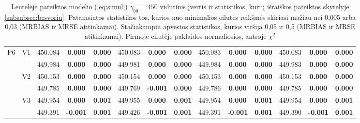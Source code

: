 \documentclass[11pt,a4paper]{article}
\begin{document}
{\begin{sidewaystable}[H]
{{\begin{tabular}{cc|ccc|ccc|ccc|ccc|}
   \hline \hline\multirow{6}{*}{P6} & \multirow{2}{*}{V1} & 450.084 & \textbf{0.000} & \textbf{0.000} & 450.083 & \textbf{0.000} & \textbf{0.000} & 450.083 & \textbf{0.000} & \textbf{0.000} & 450.083 & \textbf{0.000} & \textbf{0.000} \\ 
   &  & 449.984 & \textbf{0.000} & \textbf{0.000} & 449.981 & \textbf{0.000} & \textbf{0.000} & 449.984 & \textbf{0.000} & \textbf{0.000} & 449.983 & \textbf{0.000} & \textbf{0.000} \\ 
   & \multirow{2}{*}{V2} & 450.153 & \textbf{0.000} & \textbf{0.000} & 450.154 & \textbf{0.000} & \textbf{0.000} & 450.153 & \textbf{0.000} & \textbf{0.000} & 450.153 & \textbf{0.000} & \textbf{0.000} \\ 
   &  & 449.785 & \textbf{0.000} & \textbf{0.000} & 449.769 & \textbf{-0.001} & \textbf{0.000} & 449.786 & \textbf{0.000} & \textbf{0.000} & 449.785 & \textbf{0.000} & \textbf{0.000} \\ 
   & \multirow{2}{*}{V3} & 449.954 & \textbf{0.000} & \textbf{0.001} & 449.955 & \textbf{0.000} & \textbf{0.001} & 449.954 & \textbf{0.000} & \textbf{0.001} & 449.954 & \textbf{0.000} & \textbf{0.001} \\ 
   &  & 449.391 & \textbf{-0.001} & \textbf{0.001} & 449.426 & \textbf{-0.001} & \textbf{0.001} & 449.391 & \textbf{-0.001} & \textbf{0.001} & 449.390 & \textbf{-0.001} & \textbf{0.001} \\ 
   \hline
\end{tabular}}
}
\caption{Lentelėje pateiktos modelio (\ref{eq:simul}) $\gamma_{00}=450$ vidutinis įvertis ir statistikos, kurių išraiškos pateiktos skyrelyje \ref{subsubsec:besvoriu}. Patamsintos statistikos tos, kurios nuo minimalios eilutės reikšmės skiriasi mažiau nei 0,005 arba 0,03 (MRBIAS ir MRSE atitinkamai). Stačiakampiu apvestos statistikos, kurios viršija 0,05 ir 0,5 (MRBIAS ir MRSE atitinkamai). Pirmoje eilutėje paklaidos normaliosios, antroje $\chi^2$}
\end{sidewaystable}
}
\end{document}
